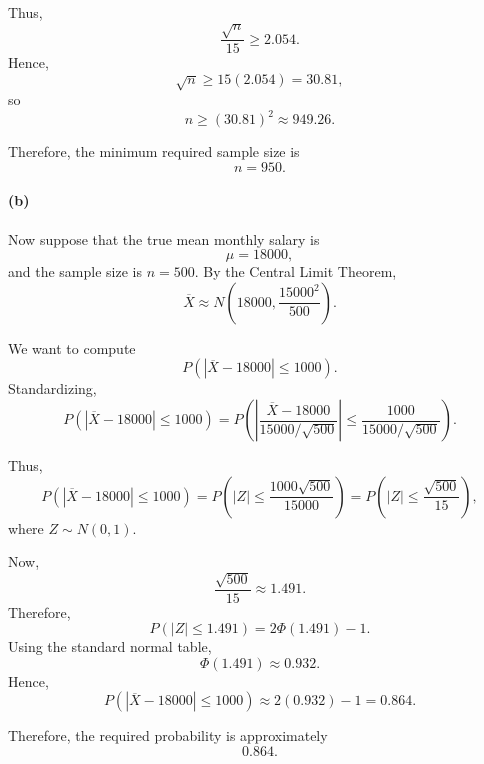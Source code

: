 \documentclass[a4paper,10pt]{article}
\begin{document}
Thus,
\[
\frac{\sqrt{n}}{15}\ge 2.054.
\]
Hence,
\[
\sqrt{n}\ge 15(2.054)=30.81,
\]
so
\[
n\ge (30.81)^2 \approx 949.26.
\]

Therefore, the minimum required sample size is
\[
\boxed{n=950.}
\]

\paragraph{(b)}
Now suppose that the true mean monthly salary is
\[
\mu=18000,
\]
and the sample size is $n=500$. By the Central Limit Theorem,
\[
\overline{X} \approx N\left(18000,\frac{15000^2}{500}\right).
\]

We want to compute
\[
P\left(|\overline{X}-18000|\le 1000\right).
\]
Standardizing,
\[
P\left(|\overline{X}-18000|\le 1000\right)
=
P\left(
\left|
\frac{\overline{X}-18000}{15000/\sqrt{500}}
\right|
\le
\frac{1000}{15000/\sqrt{500}}
\right).
\]

Thus,
\[
P\left(|\overline{X}-18000|\le 1000\right)
=
P\left(|Z|\le \frac{1000\sqrt{500}}{15000}\right)
=
P\left(|Z|\le \frac{\sqrt{500}}{15}\right),
\]
where $Z\sim N(0,1)$.

Now,
\[
\frac{\sqrt{500}}{15}\approx 1.491.
\]
Therefore,
\[
P\left(|Z|\le 1.491\right)=2\Phi(1.491)-1.
\]
Using the standard normal table,
\[
\Phi(1.491)\approx 0.932.
\]
Hence,
\[
P\left(|\overline{X}-18000|\le 1000\right)
\approx 2(0.932)-1=0.864.
\]

Therefore, the required probability is approximately
\[
\boxed{0.864.}
\]
\end{document}

